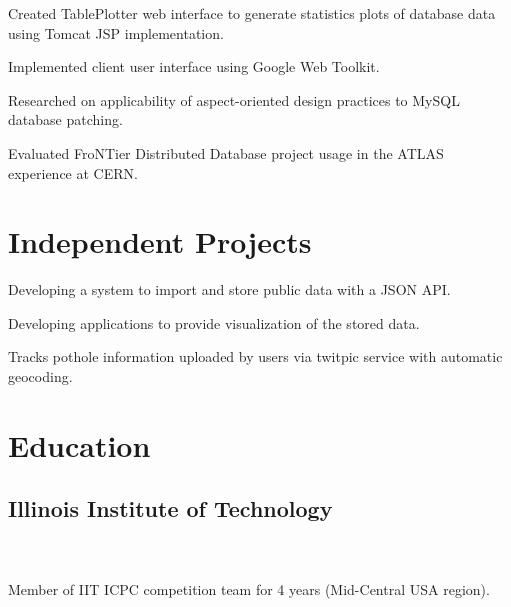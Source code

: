 \documentclass{resume}
\begin{document}

\begin{compactitem}
  \item Created TablePlotter web interface to generate statistics plots of database data using Tomcat JSP implementation.
  \item Implemented client user interface using Google Web Toolkit.
\end{compactitem}


\begin{compactitem}
  \item Researched on applicability of aspect-oriented design practices to MySQL database patching.
  \item Evaluated FroNTier Distributed Database project usage in the ATLAS experience at CERN.
\end{compactitem}


\section{Independent Projects}
\begin{compactitem}
  \item Developing a system to import and store public data with a JSON API.
  \item Developing applications to provide visualization of the stored data.
\end{compactitem}

\begin{compactitem}
  \item Tracks pothole information uploaded by users via twitpic service with automatic geocoding.
\end{compactitem}


\section{Education}

\subsection{Illinois Institute of Technology}

\\\\
Member of IIT ICPC competition team for 4 years (Mid-Central USA region).
\end{document}
